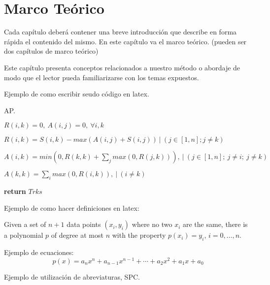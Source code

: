 \chapter{Marco Teórico}
\label{chap:cha2}

Cada capítulo deberá contener una breve introducción que describe en forma rápida el contenido del mismo. En este capítulo va el marco teórico. (pueden ser dos capítulos de marco teórico)

Este capítulo presenta conceptos relacionados a nuestro método o abordaje de modo que el lector pueda familiarizarse con los temas expuestos.


Ejemplo de como escribir seudo código en latex.
\begin{algorithm}[!htb]
	\caption{\ac{AP}.}\label{alg:ap}
	\begin{algorithmic}[1]
		\State $R(i,k) = 0, ~A(i,j)= 0, ~ \forall i,k$
		
		\State $R(i,k) = S(i,k) - max(A(i,j) + S(i,j))~|~ (j \in [1,n]; j\neq k) $
		
		\State $A(i,k) = min (0, R(k,k) + \sum_j max(0, R(j,k))), ~|~ (j \in [1,n]; ~j\neq i; ~j\neq k )$
		
		\State $A(k,k) = \sum_i max(0,R(i,k)) , ~|~ (i \neq k)$ 
		
		\EndWhile
		\State \textbf{return} $Trks$
		\EndProcedure
	\end{algorithmic}
\end{algorithm} 

Ejemplo de como hacer definiciones en latex:

\begin{defn}
Given a set of $n + 1$ data points $(x_i, y_i)$ where no two $x_i$ are the same, there is a polynomial $p$ of degree at most $n$ with the property $p(x_i) = y_i$, $i=0,\ldots,n$.
\end{defn}

Ejemplo de ecuaciones: 
\begin{equation}
	\label{eqn:interpolation}
	 p(x) = a_n x^n + a_{n-1} x^{n-1} + \cdots + a_2 x^2 + a_1 x + a_0
\end{equation}

 
 Ejemplo de utilización de abreviaturas, \ac{SPC}.
 
 
